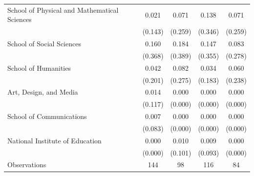 {\begin{tabular}{l*{4}{c}}
School of Physical and Mathematical Sciences&       0.021&       0.071&       0.138&       0.071\\
                    &     (0.143)&     (0.259)&     (0.346)&     (0.259)\\
School of Social Sciences&       0.160&       0.184&       0.147&       0.083\\
                    &     (0.368)&     (0.389)&     (0.355)&     (0.278)\\
School of Humanities&       0.042&       0.082&       0.034&       0.060\\
                    &     (0.201)&     (0.275)&     (0.183)&     (0.238)\\
Art, Design, and Media&       0.014&       0.000&       0.000&       0.000\\
                    &     (0.117)&     (0.000)&     (0.000)&     (0.000)\\
School of Communications&       0.007&       0.000&       0.000&       0.000\\
                    &     (0.083)&     (0.000)&     (0.000)&     (0.000)\\
National Institute of Education&       0.000&       0.010&       0.009&       0.000\\
                    &     (0.000)&     (0.101)&     (0.093)&     (0.000)\\
\midrule
Observations        &         144&          98&         116&          84\\
\bottomrule
\end{tabular}
}
